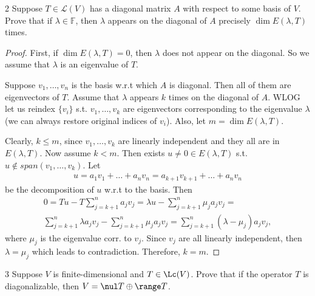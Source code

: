 \documentclass{extarticle}
\begin{document}
\begin{problem}{2}
    Suppose $ T \in \mathcal{L}(V) $ has a diagonal matrix $ A $ with respect to some basis of 
    $ V $. Prove that if $ \lambda \in \mathbb{F} $, then $ \lambda $ appears
    on the diagonal of $ A $ precisely $ \dim E(\lambda, T) $ times.
\end{problem}

\begin{proof}
    First, if $ \dim E(\lambda, T) = 0 $, then $ \lambda $ does not appear on the diagonal.
    So we assume that $ \lambda $ is an eigenvalue of $ T $.
    
    Suppose $ v_1, \ldots, v_n $ is the basis w.r.t which $ A $ is diagonal.
    Then all of them are eigenvectors of $ T $.
    Assume that $ \lambda $ appears $ k $ times on the diagonal of $ A $.
    WLOG let us reindex $ \{ v_i \} $ s.t. $ v_{1}, \ldots, v_{k} $ are
    eigenvectors corresponding to the 
    eigenvalue $ \lambda $
    (we can always restore original indices of $ v_i $).
    Also, let $ m = \dim E(\lambda, T) $. 

    Clearly, $ k \leq m $, since $ v_{1}, \ldots, v_{k} $ are linearly independent
    and they all are in $ E(\lambda, T) $. Now assume $ k < m $.
    Then exists $ u \ne 0 \in E(\lambda, T) $ s.t. 
    $ u \not \in span(v_1, \ldots, v_k) $.
    Let
    \begin{gather*}
        u = a_1 v_1 + \ldots + a_n v_n = a_{k+1} v_{k+1} + \ldots + a_{n} v_n
    \end{gather*}
    be the decomposition of $ u $ w.r.t to the basis.
    Then
    \begin{gather*}
        0 = Tu - T \sum_{j=k+1}^{n} a_{j} v_{j} =
        \lambda u - \sum_{j=k+1}^{n} \mu_{j} a_{j} v_{j}
        = 
        \\ \sum_{j=k+1}^{n} \lambda a_{j} v_{j} - \sum_{j=k+1}^{n} \mu_{j} a_{j} v_{j}
        = \sum_{j=k+1}^{n} (\lambda - \mu_j) a_{j} v_{j},
    \end{gather*}
    where  $ \mu_j $ is the eigenvalue corr. to $ v_j $. Since $ v_j $ are all 
    linearly independent, then $ \lambda = \mu_j $ which leads to contradiction.
    Therefore, $ k = m $.
\end{proof}

\begin{problem}{3}
    Suppose \(V\) is finite-dimensional and \(T \in \Lc(V)\). Prove that if the operator \(T\) is 
    diagonalizable, then \(V = \nul T \oplus \range T\).
\end{problem}
\end{document}
